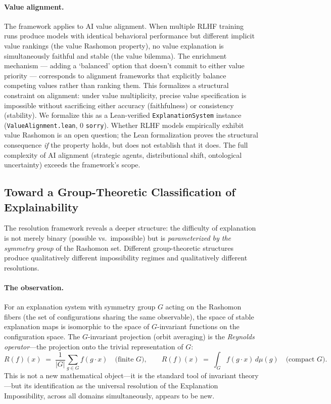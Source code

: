 \documentclass[11pt,a4paper]{article}
\begin{document}
\paragraph{Value alignment.} The framework applies to AI value alignment. When multiple RLHF training runs produce models with identical behavioral performance but different implicit value rankings (the value Rashomon property), no value explanation is simultaneously faithful and stable (the value bilemma). The enrichment mechanism --- adding a `balanced' option that doesn't commit to either value priority --- corresponds to alignment frameworks that explicitly balance competing values rather than ranking them. This formalizes a structural constraint on alignment: under value multiplicity, precise value specification is impossible without sacrificing either accuracy (faithfulness) or consistency (stability). We formalize this as a Lean-verified \texttt{ExplanationSystem} instance (\texttt{ValueAlignment.lean}, 0 \texttt{sorry}).  Whether RLHF models empirically exhibit value Rashomon is an open question; the Lean formalization proves the structural consequence \emph{if} the property holds, but does not establish that it does.  The full complexity of AI alignment (strategic agents, distributional shift, ontological uncertainty) exceeds the framework's scope.

\subsection{Toward a Group-Theoretic Classification of Explainability}
\label{sec:group-classification}

The resolution framework reveals a deeper structure: the difficulty of
explanation is not merely binary (possible vs.\ impossible) but is
\emph{parameterized by the symmetry group} of the Rashomon set.
Different group-theoretic structures produce qualitatively different
impossibility regimes and qualitatively different resolutions.

\paragraph{The observation.}
For an explanation system with symmetry group $G$ acting on the Rashomon
fibers (the set of configurations sharing the same observable), the space
of stable explanation maps is isomorphic to the space of $G$-invariant
functions on the configuration space.  The $G$-invariant projection
(orbit averaging) is the \emph{Reynolds operator}---the projection onto
the trivial representation of $G$:
\[
  R(f)(x) \;=\; \frac{1}{|G|} \sum_{g \in G} f(g \cdot x)
  \quad\text{(finite $G$)},
  \qquad
  R(f)(x) \;=\; \int_G f(g \cdot x)\, d\mu(g)
  \quad\text{(compact $G$)}.
\]
This is not a new mathematical object---it is the standard tool of invariant
theory \citep{sturmfels2008algorithms}---but its identification as the
universal resolution of the Explanation Impossibility, across all domains
simultaneously, appears to be new.
\end{document}
